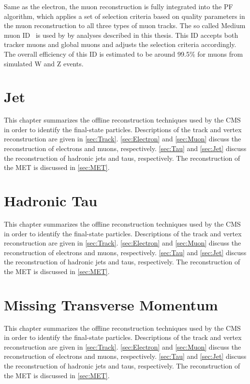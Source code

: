 Same as the electron, the muon reconstruction is fully integrated into the \ac{PF} algorithm, which applies a set of selection criteria based on quality parameters in the muon reconstruction to all three types of muon tracks. The so called Medium muon ID~\cite{CMS:2018rym} is used by by analyses described in this thesis. This ID accepts both tracker muons and global muons and adjusts the selection criteria accordingly. The overall efficiency of this ID is estimated to be around 99.5\%  for muons from simulated W and Z events.

\section{Jet}
\label{sec:Jet}

This chapter summarizes the offline reconstruction techniques used by the \ac{CMS} in order to identify the final-state particles. Descriptions of the track and vertex reconstruction are given in \autoref{sec:Track}. \autoref{sec:Electron} and \autoref{sec:Muon} discuss the reconstruction of electrons and muons, respectively. \autoref{sec:Tau} and \autoref{sec:Jet} discuss the reconstruction of hadronic jets and taus, respectively. The reconstruction of the \ac{MET} is discussed in \autoref{sec:MET}.

\section{Hadronic Tau}
\label{sec:Tau}

This chapter summarizes the offline reconstruction techniques used by the \ac{CMS} in order to identify the final-state particles. Descriptions of the track and vertex reconstruction are given in \autoref{sec:Track}. \autoref{sec:Electron} and \autoref{sec:Muon} discuss the reconstruction of electrons and muons, respectively. \autoref{sec:Tau} and \autoref{sec:Jet} discuss the reconstruction of hadronic jets and taus, respectively. The reconstruction of the \ac{MET} is discussed in \autoref{sec:MET}.

\section{Missing Transverse Momentum}
\label{sec:MET}

This chapter summarizes the offline reconstruction techniques used by the \ac{CMS} in order to identify the final-state particles. Descriptions of the track and vertex reconstruction are given in \autoref{sec:Track}. \autoref{sec:Electron} and \autoref{sec:Muon} discuss the reconstruction of electrons and muons, respectively. \autoref{sec:Tau} and \autoref{sec:Jet} discuss the reconstruction of hadronic jets and taus, respectively. The reconstruction of the \ac{MET} is discussed in \autoref{sec:MET}.
